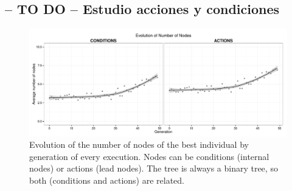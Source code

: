 \documentclass[preprint]{elsarticle}
\begin{document}
\begin{table}
\end{table}


\subsection{-- TO DO -- Estudio acciones y condiciones}

 \begin{figure}[ht]
 \begin{center}
   \includegraphics[width=12cm]{nuevas_imgs/estudio_number_nodes.pdf}
 \end{center}
 \caption{Evolution of the number of nodes of the best individual by generation of every execution. Nodes can be conditions (internal nodes) or actions (lead nodes). The tree is always a binary tree, so both (conditions and actions) are related.}
 \label{figura:e_number_nodes}
 \end{figure}
\end{document}

